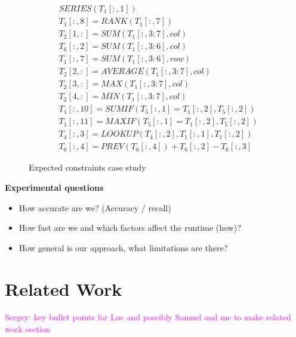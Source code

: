 \documentclass{ecai}
\newcommand{\sergey}[1]{\textcolor{magenta}{{\sc Sergey:} #1}\xspace}
\newcommand{\range}[3]{\ensuremath{#1[#2,#3]}}
\newcommand{\rangeto}[2]{#1{:}#2}
\newcommand{\rangeall}{:}
\begin{document}
\begin{figure}
  \label{fig:sol_example}
  {\small
    \begin{align*}
      & SERIES(\range{T_{1}}{\rangeall}{1}) \\
      & \range{T_{1}}{\rangeall}{8} = RANK(\range{T_{1}}{\rangeall}{7}) \\
      & \range{T_{2}}{1}{\rangeall} = SUM(\range{T_{1}}{\rangeall}{\rangeto{3}{7}}, col) \\
      & \range{T_{6}}{\rangeall}{2} = SUM(\range{T_{1}}{\rangeall}{\rangeto{3}{6}}, col) \\
      & \range{T_{1}}{\rangeall}{7} = SUM(\range{T_{1}}{\rangeall}{\rangeto{3}{6}}, row) \\
      & \range{T_{2}}{2}{\rangeall} = AVERAGE(\range{T_{1}}{\rangeall}{\rangeto{3}{7}}, col) \\
      & \range{T_{2}}{3}{\rangeall} = MAX(\range{T_{1}}{\rangeall}{\rangeto{3}{7}}, col) \\
      & \range{T_{2}}{4}{\rangeall} = MIN(\range{T_{1}}{\rangeall}{\rangeto{3}{7}}, col) \\
      & \range{T_{1}}{\rangeall}{10} = SUMIF(\range{T_{5}}{\rangeall}{1}=\range{T_{1}}{\rangeall}{2}, \range{T_{5}}{\rangeall}{2}) \\
      & \range{T_{1}}{\rangeall}{11} = MAXIF(\range{T_{5}}{\rangeall}{1}=\range{T_{1}}{\rangeall}{2}, \range{T_{5}}{\rangeall}{2}) \\
      & \range{T_{4}}{\rangeall}{3} = LOOKUP(\range{T_{4}}{\rangeall}{2}, \range{T_{1}}{\rangeall}{1}, \range{T_{1}}{\rangeall}{2}) \\
      & \range{T_{6}}{\rangeall}{4} = PREV(\range{T_{6}}{\rangeall}{4}) + \range{T_{6}}{\rangeall}{2} - \range{T_{6}}{\rangeall}{3}
    \end{align*}
  }%
  \caption{Expected constraints case study}
\end{figure}

{\bfseries 
  Experimental questions
}
\begin{itemize}
  \item  How accurate are we? (Accuracy / recall)
  \item  How fast are we and which factors affect the runtime (how)?
  \item  How general is our approach, what limitations are there?
\end{itemize}


\section{Related Work}
\sergey{key bullet points for Luc and possibly Samuel and me to make related work section}
\end{document}

